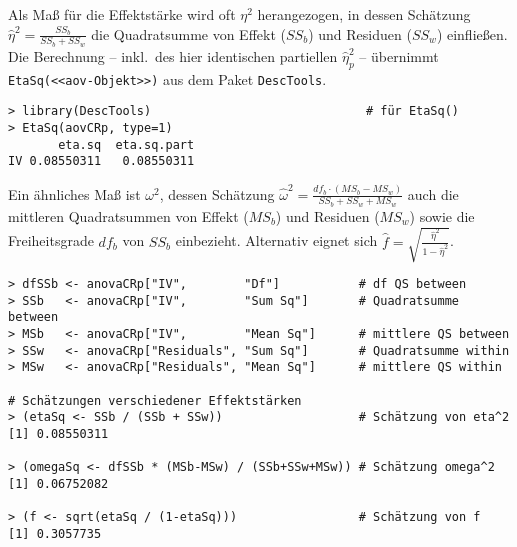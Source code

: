 Als Maß für die Effektstärke wird oft $\eta^{2}$ herangezogen, in dessen Schätzung $\hat{\eta}^{2} = \frac{SS_{b}}{SS_{b} + SS_{w}}$ die Quadratsumme von Effekt ($SS_{b}$) und Residuen ($SS_{w}$) einfließen. Die Berechnung -- inkl.\ des hier identischen partiellen  $\hat{\eta}^{2}_{p}$ -- übernimmt \lstinline!EtaSq(<<aov-Objekt>>)! aus dem Paket \lstinline!DescTools!.
\begin{lstlisting}
> library(DescTools)                              # für EtaSq()
> EtaSq(aovCRp, type=1)
       eta.sq  eta.sq.part
IV 0.08550311   0.08550311
\end{lstlisting}

Ein ähnliches Maß ist $\omega^{2}$, dessen Schätzung $\hat{\omega}^{2} = \frac{df_{b} \cdot (MS_{b}-MS_{w})}{SS_{b} + SS_{w} + MS_{w}}$ auch die mittleren Quadratsummen von Effekt ($MS_{b}$) und Residuen ($MS_{w}$) sowie die Freiheitsgrade $df_{b}$ von $SS_{b}$ einbezieht. Alternativ eignet sich $\hat{f} = \sqrt{\frac{\hat{\eta}^{2}}{1-\hat{\eta}^{2}}}$. %
\begin{lstlisting}
> dfSSb <- anovaCRp["IV",        "Df"]           # df QS between
> SSb   <- anovaCRp["IV",        "Sum Sq"]       # Quadratsumme between
> MSb   <- anovaCRp["IV",        "Mean Sq"]      # mittlere QS between
> SSw   <- anovaCRp["Residuals", "Sum Sq"]       # Quadratsumme within
> MSw   <- anovaCRp["Residuals", "Mean Sq"]      # mittlere QS within

# Schätzungen verschiedener Effektstärken
> (etaSq <- SSb / (SSb + SSw))                   # Schätzung von eta^2
[1] 0.08550311

> (omegaSq <- dfSSb * (MSb-MSw) / (SSb+SSw+MSw)) # Schätzung omega^2
[1] 0.06752082

> (f <- sqrt(etaSq / (1-etaSq)))                 # Schätzung von f
[1] 0.3057735
\end{lstlisting}

